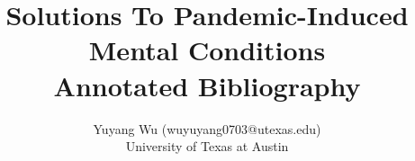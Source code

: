\documentclass[11pt]{article}
\title{Solutions To Pandemic-Induced Mental Conditions\\\medskip Annotated Bibliography}
\author{Yuyang Wu (wuyuyang0703@utexas.edu)\\University of Texas at Austin}
\begin{document}
\maketitle
\nocite{*}


\end{document}
